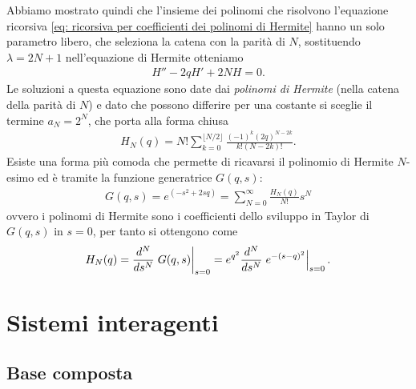 Abbiamo mostrato quindi che l'insieme dei polinomi che risolvono l'equazione ricorsiva \eqref{eq: ricorsiva per coefficienti dei polinomi di Hermite} 
hanno un solo parametro libero, che seleziona la catena con la parità di $ N $, sostituendo $ \lambda = 2N +1 $ nell'equazione di Hermite otteniamo 
\begin{align*}
  H'' - 2qH' + 2N H = 0.
\end{align*}
Le soluzioni a questa equazione sono date dai \textit{polinomi di Hermite} (nella catena della parità di $ N $) e dato che possono differire per una 
costante si sceglie il termine $ a_N = 2^N $, che porta alla forma chiusa 
\begin{align*}
  H_N(q) = N!\sum_{k = 0}^{\lfloor N/2 \rfloor} \frac{ (-1)^k (2q)^{N - 2k} }{k! (N - 2k)!}.
\end{align*}
Esiste una forma più comoda che permette di ricavarsi il polinomio di Hermite $ N $-esimo ed è tramite la funzione generatrice $ G(q, s) $:
\begin{align*}
  G(q,s) = e^{(-s^2 + 2sq)} = \sum_{N = 0}^\infty \frac{H_N(q)}{N!} s^N
\end{align*}
ovvero i polinomi di Hermite sono i coefficienti dello sviluppo in Taylor di $ G(q,s) $ in $ s = 0 $, per tanto si ottengono come 
\begin{align*}
  H_N(q) = \frac{d^N}{ds^N} \left. \phB G(q,s) \right|_{s=0} = e^{q^2} \frac{d^N}{ds^N}  \left. e^{- (s - q)^2} \right|_{s=0}.
\end{align*}

\chapter{Sistemi interagenti}

\section{Base composta}

